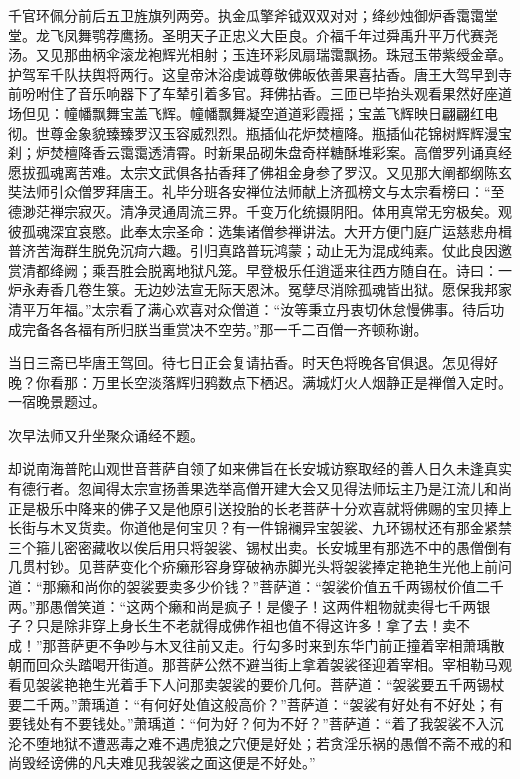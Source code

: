 \documentclass[12pt,UTF8]{ctexbook}
\begin{document}
{千官环佩分前后五卫旌旗列两旁。执金瓜擎斧钺双双对对；绛纱烛御炉香霭霭堂堂。龙飞凤舞鹗荐鹰扬。圣明天子正忠义大臣良。介福千年过舜禹升平万代赛尧汤。又见那曲柄伞滚龙袍辉光相射；玉连环彩凤扇瑞霭飘扬。珠冠玉带紫绶金章。护驾军千队扶舆将两行。这皇帝沐浴虔诚尊敬佛皈依善果喜拈香。唐王大驾早到寺前吩咐住了音乐响器下了车辇引着多官。拜佛拈香。三匝已毕抬头观看果然好座道场但见：幢幡飘舞宝盖飞辉。幢幡飘舞凝空道道彩霞摇；宝盖飞辉映日翩翩红电彻。世尊金象貌臻臻罗汉玉容威烈烈。瓶插仙花炉焚檀降。瓶插仙花锦树辉辉漫宝刹；炉焚檀降香云霭霭透清霄。时新果品砌朱盘奇样糖酥堆彩案。高僧罗列诵真经愿拔孤魂离苦难。太宗文武俱各拈香拜了佛祖金身参了罗汉。又见那大阐都纲陈玄奘法师引众僧罗拜唐王。礼毕分班各安禅位法师献上济孤榜文与太宗看榜曰：“至德渺茫禅宗寂灭。清净灵通周流三界。千变万化统摄阴阳。体用真常无穷极矣。观彼孤魂深宜哀愍。此奉太宗圣命：选集诸僧参禅讲法。大开方便门庭广运慈悲舟楫普济苦海群生脱免沉疴六趣。引归真路普玩鸿蒙；动止无为混成纯素。仗此良因邀赏清都绛阙；乘吾胜会脱离地狱凡笼。早登极乐任逍遥来往西方随自在。诗曰：一炉永寿香几卷生箓。无边妙法宣无际天恩沐。冤孽尽消除孤魂皆出狱。愿保我邦家清平万年福。”太宗看了满心欢喜对众僧道：“汝等秉立丹衷切休怠慢佛事。待后功成完备各各福有所归朕当重赏决不空劳。”那一千二百僧一齐顿称谢。

当日三斋已毕唐王驾回。待七日正会复请拈香。时天色将晚各官俱退。怎见得好晚？你看那：万里长空淡落辉归鸦数点下栖迟。满城灯火人烟静正是禅僧入定时。一宿晚景题过。

次早法师又升坐聚众诵经不题。

却说南海普陀山观世音菩萨自领了如来佛旨在长安城访察取经的善人日久未逢真实有德行者。忽闻得太宗宣扬善果选举高僧开建大会又见得法师坛主乃是江流儿和尚正是极乐中降来的佛子又是他原引送投胎的长老菩萨十分欢喜就将佛赐的宝贝捧上长街与木叉货卖。你道他是何宝贝？有一件锦襕异宝袈裟、九环锡杖还有那金紧禁三个箍儿密密藏收以俟后用只将袈裟、锡杖出卖。长安城里有那选不中的愚僧倒有几贯村钞。见菩萨变化个疥癞形容身穿破衲赤脚光头将袈裟捧定艳艳生光他上前问道：“那癞和尚你的袈裟要卖多少价钱？”菩萨道：“袈裟价值五千两锡杖价值二千两。”那愚僧笑道：“这两个癞和尚是疯子！是傻子！这两件粗物就卖得七千两银子？只是除非穿上身长生不老就得成佛作祖也值不得这许多！拿了去！卖不成！”那菩萨更不争吵与木叉往前又走。行勾多时来到东华门前正撞着宰相萧瑀散朝而回众头踏喝开街道。那菩萨公然不避当街上拿着袈裟径迎着宰相。宰相勒马观看见袈裟艳艳生光着手下人问那卖袈裟的要价几何。菩萨道：“袈裟要五千两锡杖要二千两。”萧瑀道：“有何好处值这般高价？”菩萨道：“袈裟有好处有不好处；有要钱处有不要钱处。”萧瑀道：“何为好？何为不好？”菩萨道：“着了我袈裟不入沉沦不堕地狱不遭恶毒之难不遇虎狼之穴便是好处；若贪淫乐祸的愚僧不斋不戒的和尚毁经谤佛的凡夫难见我袈裟之面这便是不好处。”

}
\end{document}
